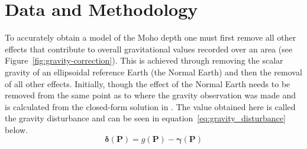 \chapter{Data and Methodology}

To accurately obtain a model of the Moho depth one must first remove all other effects that contribute to overall gravitational values recorded over an area (see Figure~\ref{fig:gravity-correction}). This is achieved through removing the scalar gravity of an ellipsoidal reference Earth (the Normal Earth) and then the removal of all other effects. Initially, though the effect of the Normal Earth needs to be removed from the same point as to where the gravity observation was made and is calculated from the closed-form solution in \cite{Li2001a}. The value obtained here is called the gravity disturbance and can be seen in equation~\ref{eq:gravity_disturbance} below.
\begin{equation}
  \mathbf{\delta}(\mathbf{P}) =
    {g}(\mathbf{P}) -
    \mathbf{\gamma}(\mathbf{P})
  \label{eq:gravity_disturbance}
\end{equation}

